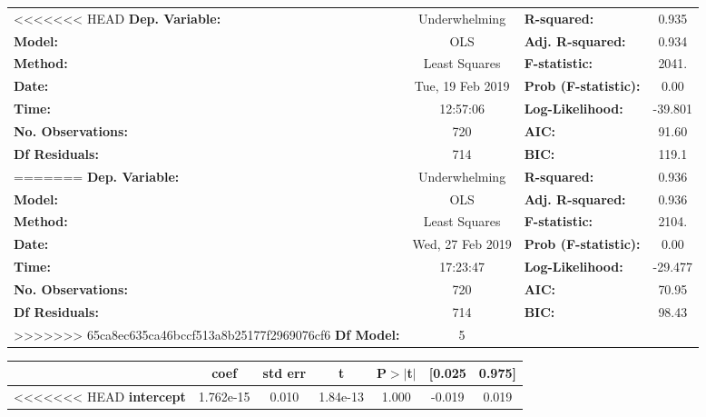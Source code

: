 \begin{center}
\begin{tabular}{lclc}
\toprule
<<<<<<< HEAD
\textbf{Dep. Variable:}    &  Underwhelming   & \textbf{  R-squared:         } &     0.935   \\
\textbf{Model:}            &       OLS        & \textbf{  Adj. R-squared:    } &     0.934   \\
\textbf{Method:}           &  Least Squares   & \textbf{  F-statistic:       } &     2041.   \\
\textbf{Date:}             & Tue, 19 Feb 2019 & \textbf{  Prob (F-statistic):} &     0.00    \\
\textbf{Time:}             &     12:57:06     & \textbf{  Log-Likelihood:    } &   -39.801   \\
\textbf{No. Observations:} &         720      & \textbf{  AIC:               } &     91.60   \\
\textbf{Df Residuals:}     &         714      & \textbf{  BIC:               } &     119.1   \\
=======
\textbf{Dep. Variable:}    &  Underwhelming   & \textbf{  R-squared:         } &     0.936   \\
\textbf{Model:}            &       OLS        & \textbf{  Adj. R-squared:    } &     0.936   \\
\textbf{Method:}           &  Least Squares   & \textbf{  F-statistic:       } &     2104.   \\
\textbf{Date:}             & Wed, 27 Feb 2019 & \textbf{  Prob (F-statistic):} &     0.00    \\
\textbf{Time:}             &     17:23:47     & \textbf{  Log-Likelihood:    } &   -29.477   \\
\textbf{No. Observations:} &         720      & \textbf{  AIC:               } &     70.95   \\
\textbf{Df Residuals:}     &         714      & \textbf{  BIC:               } &     98.43   \\
>>>>>>> 65ca8ec635ca46bccf513a8b25177f2969076cf6
\textbf{Df Model:}         &           5      & \textbf{                     } &             \\
\bottomrule
\end{tabular}
\begin{tabular}{lcccccc}
                         & \textbf{coef} & \textbf{std err} & \textbf{t} & \textbf{P$>$$|$t$|$} & \textbf{[0.025} & \textbf{0.975]}  \\
\midrule
<<<<<<< HEAD
\textbf{intercept}  &    1.762e-15  &        0.010     &  1.84e-13  &         1.000        &       -0.019    &        0.019     \\

\end{tabular}
\end{center}
